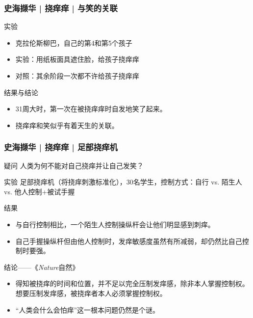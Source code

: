 \begin{frame}
  \frametitle{史海撷华 | 挠痒痒 | 与笑的关联}
  \begin{block}{实验}
    \begin{itemize}
      \item 克拉伦斯\textbullet 柳巴，自己的第4和第5个孩子
      \item 实验：用纸板面具遮住脸，给孩子挠痒痒
      \item 对照：其余阶段一次都不许给孩子挠痒痒
    \end{itemize}
  \end{block}
  \pause
  \begin{block}{结果与结论}
    \begin{itemize}
      \item 31周大时，第一次在被挠痒痒时自发地笑了起来。
      \item \alert{挠痒痒和笑似乎有着天生的关联。}
    \end{itemize}
  \end{block}
\end{frame}

\begin{frame}
  \frametitle{史海撷华 | 挠痒痒 | 足部挠痒机}
  \begin{block}{疑问}
    人类为何不能对自己挠痒并让自己发笑？
  \end{block}
  \vspace{-0.5em}
  \pause
  \begin{block}{实验}
      足部挠痒机（将挠痒刺激标准化），30名学生，控制方式：自行 vs. 陌生人 vs. 他人控制+被试手握
  \end{block}
  \vspace{-0.5em}
  \pause
  \begin{block}{结果}
    \begin{itemize}
      \item 与自行控制相比，一个陌生人控制操纵杆会让他们明显感到刺痒。
      \item 自己手握操纵杆但由他人控制时，发痒敏感度虽然有所减弱，却仍然比自己控制时要强。
    \end{itemize}
  \end{block}
  \vspace{-0.5em}
  \pause
  \begin{block}{结论——《\textit{Nature}自然》}
    \begin{itemize}
      \item 得知被挠痒的时间和位置，并不足以完全压制发痒感，除非本人掌握控制权。想要压制发痒感，被挠痒者本人必须掌握控制权。
      \item “人类会什么会怕痒”这一根本问题仍然是个谜。
    \end{itemize}
  \end{block}
\end{frame}

